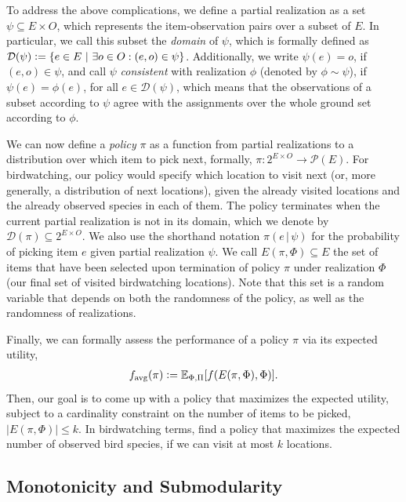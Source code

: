 \documentclass{article}
\newcommand{\defeq}{\vcentcolon=}
\let\originalleft\left
\let\originalright\right
\renewcommand{\left}{\mathopen{}\mathclose\bgroup\originalleft}
\renewcommand{\right}{\aftergroup\egroup\originalright}
\newcommand{\smid}{\ \middle\vert\ }
\newcommand{\mmid}{\,\vert\,}
\newcommand{\sdef}[2]{\left\{#1\smid#2\right\}}
\newcommand{\favg}{f_{\mathrm{avg}}}
\newcommand{\dom}{\mathcal{D}}
\begin{document}
To address the above complications, we define a partial realization as a set $ \psi \subseteq E \times O$, which represents the item-observation pairs over a subset of $E$.
In particular, we call this subset the \emph{domain} of $\psi$, which is formally defined as $\dom(\psi) \defeq \sdef{e \in E}{\exists o \in O : (e, o) \in \psi}$.
Additionally, we write $\psi(e) = o$, if $(e, o) \in \psi$, and call $\psi$ \emph{consistent} with realization $\phi$ (denoted by $\phi \sim \psi$), if $\psi(e) = \phi(e)$, for all $e \in \dom(\psi)$, which means that the observations of a subset according to $\psi$ agree with the assignments over the whole ground set according to $\phi$.

We can now define a \emph{policy} $\pi$ as a function from partial realizations to a distribution over which item to pick next, formally, $\pi : 2^{E \times O} \to \mathcal{P}(E)$.
For birdwatching, our policy would specify which location to visit next (or, more generally, a distribution of next locations), given the already visited locations and the already observed species in each of them.
The policy terminates when the current partial realization is not in its domain, which we denote by $\dom(\pi) \subseteq 2^{E \times O}$.
We also use the shorthand notation $\pi(e\mmid\psi)$ for the probability of picking item $e$ given partial realization $\psi$.
We call $E(\pi, \Phi) \subseteq E$ the set of items that have been selected upon termination of policy $\pi$ under realization $\Phi$ (our final set of visited birdwatching locations).
Note that this set is a random variable that depends on both the randomness of the policy, as well as the randomness of realizations.

Finally, we can formally assess the performance of a policy $\pi$ via its expected utility,
\begin{align*}
  \favg(\pi) \defeq \E[\Phi,\Pi]{f(E(\pi, \Phi), \Phi)}.
\end{align*}
Then, our goal is to come up with a policy that maximizes the expected utility, subject to a cardinality constraint on the number of items to be picked, $|E(\pi, \Phi)| \leq k$.
In birdwatching terms, find a policy that maximizes the expected number of observed bird species, if we can visit at most $k$ locations.

\subsection{Monotonicity and Submodularity}
\end{document}
